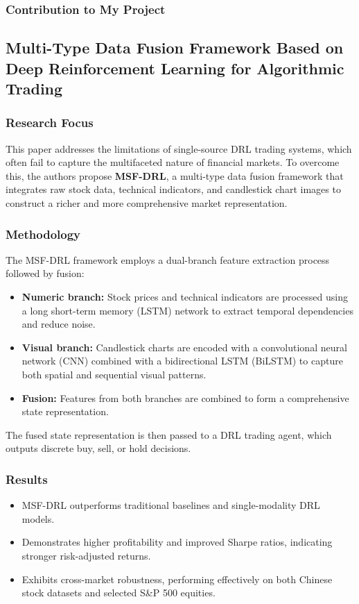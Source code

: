 \documentclass[12pt,a4paper]{report}
\begin{document}
\subsubsection{Contribution to My Project}


\subsection{Multi-Type Data Fusion Framework Based on Deep Reinforcement Learning for Algorithmic Trading \cite{liu2022msf_drl}}

\subsubsection{Research Focus}
This paper addresses the limitations of single-source DRL trading systems, which often fail to capture the multifaceted nature of financial markets. To overcome this, the authors propose \textbf{MSF-DRL}, a multi-type data fusion framework that integrates raw stock data, technical indicators, and candlestick chart images to construct a richer and more comprehensive market representation.

\subsubsection{Methodology}
The MSF-DRL framework employs a dual-branch feature extraction process followed by fusion:
\begin{itemize}
    \item \textbf{Numeric branch:} Stock prices and technical indicators are processed using a long short-term memory (LSTM) network to extract temporal dependencies and reduce noise.  
    \item \textbf{Visual branch:} Candlestick charts are encoded with a convolutional neural network (CNN) combined with a bidirectional LSTM (BiLSTM) to capture both spatial and sequential visual patterns.  
    \item \textbf{Fusion:} Features from both branches are combined to form a comprehensive state representation.  
\end{itemize}

The fused state representation is then passed to a DRL trading agent, which outputs discrete buy, sell, or hold decisions.

\subsubsection{Results}
\begin{itemize}
    \item MSF-DRL outperforms traditional baselines and single-modality DRL models.  
    \item Demonstrates higher profitability and improved Sharpe ratios, indicating stronger risk-adjusted returns.  
    \item Exhibits cross-market robustness, performing effectively on both Chinese stock datasets and selected S\&P 500 equities.  
\end{itemize}
\end{document}
